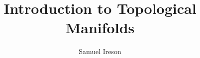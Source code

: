 

\usepackage[backend=biber]{biblatex}


\title{Introduction to Topological Manifolds}

\author{Samuel Ireson}








